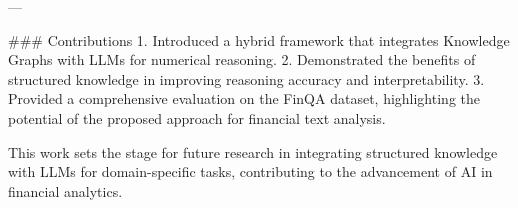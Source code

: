 ---

### Contributions  
1. Introduced a hybrid framework that integrates Knowledge Graphs with LLMs for numerical reasoning.  
2. Demonstrated the benefits of structured knowledge in improving reasoning accuracy and interpretability.  
3. Provided a comprehensive evaluation on the FinQA dataset, highlighting the potential of the proposed approach for financial text analysis.  

This work sets the stage for future research in integrating structured knowledge with LLMs for domain-specific tasks, contributing to the advancement of AI in financial analytics.